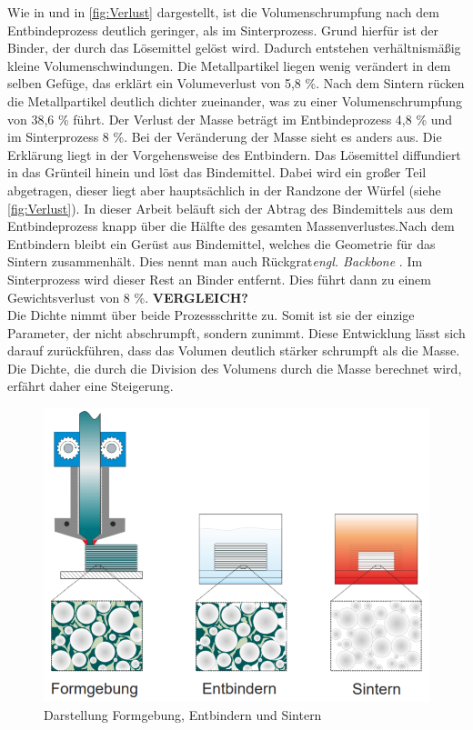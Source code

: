 Wie in \Autocite{Industrie4} und in \autoref{fig:Verlust} dargestellt, ist die Volumenschrumpfung nach dem Entbindeprozess deutlich geringer, als im Sinterprozess. Grund hierfür ist der Binder, der durch das Lösemittel gelöst wird. Dadurch entstehen verhältnismäßig kleine Volumenschwindungen. Die Metallpartikel liegen wenig verändert in dem selben Gefüge, das erklärt ein Volumeverlust von 5,8 \%. Nach dem Sintern rücken die Metallpartikel deutlich dichter zueinander, was zu einer Volumenschrumpfung von 38,6 \% führt. Der Verlust der Masse beträgt im Entbindeprozess 4,8 \% und im Sinterprozess 8 \%. Bei der Veränderung der Masse sieht es anders aus. Die Erklärung liegt in der Vorgehensweise des Entbindern. Das Lösemittel diffundiert in das Grünteil hinein und löst das Bindemittel. Dabei wird ein großer Teil abgetragen, dieser liegt aber hauptsächlich in der Randzone der Würfel (siehe \autoref{fig:Verlust}). In dieser Arbeit beläuft sich der Abtrag des Bindemittels aus dem Entbindeprozess knapp über die Hälfte des gesamten Massenverlustes.Nach dem Entbindern bleibt ein Gerüst aus Bindemittel, welches die Geometrie für das Sintern zusammenhält. Dies nennt man auch Rückgrat\textit{engl. Backbone} \Autocite{Industrie4}.
Im Sinterprozess wird dieser Rest an Binder entfernt. Dies führt dann zu einem Gewichtsverlust von 8 \%. \textbf{VERGLEICH?}\\
Die Dichte nimmt über beide Prozessschritte zu. Somit ist sie der einzige Parameter, der nicht abschrumpft, sondern zunimmt. Diese Entwicklung lässt sich darauf zurückführen, dass das Volumen deutlich stärker schrumpft als die Masse. Die Dichte, die durch die Division des Volumens durch die Masse berechnet wird, erfährt daher eine Steigerung.

\begin{figure}[h] 
  \centering
  \includegraphics[width=0.8\linewidth]{bilder/Kukla_Bild1.png}
        \caption[Darstellung Formgebung, Entbindern und Sintern] {Darstellung Formgebung, Entbindern und Sintern \autocite{Industrie4}}
  \label{fig:Verlust}
\end{figure}

